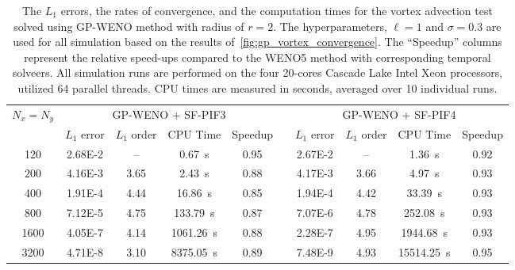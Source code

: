 \begin{table}
    \centering
    \caption{The \( L_{1} \) errors, the rates of convergence,
        and the computation times for the vortex advection test
        solved using GP-WENO method with radius of \( r = 2 \).
        The hyperparameters, \( \ell = 1 \) and \( \sigma = 0.3 \)
        are used for all simulation based on the results of~\cref{fig:gp_vortex_convergence}.
        The ``Speedup'' columns represent the relative speed-ups
        compared to the WENO5 method with corresponding temporal solveers.
        All simulation runs are
        performed on the four 20-cores
        Cascade Lake Intel Xeon processors, utilized 64 parallel threads.
        CPU times are measured in seconds, averaged over 10 individual runs.
    }\label{table:vortex_gp2}
    \begin{adjustbox}{width=\textwidth}
        \begin{tabular}{@{}ccccclcccc@{}}
            \toprule
            \multirow{2}{*}{\( N_{x} = N_{y} \)} & \multicolumn{4}{c}{GP-WENO + SF-PIF3} &  & \multicolumn{4}{c}{GP-WENO + SF-PIF4} \\
            \cmidrule(lr){2-5} \cmidrule(l){7-10}
            & \(L_{1}\) error & \(L_{1}\) order & CPU Time & Speedup &  &
            \(L_{1}\) error & \(L_{1}\) order & CPU Time & Speedup \\ \midrule
            120  & \num{2.68E-2} & \--- & \SI{0.67}{\second}      & 0.95 &  & \num{2.67E-2} & \--- & \SI{1.36}{\second}     & 0.92 \\
            200  & \num{4.16E-3} & 3.65 & \SI{2.43}{\second}      & 0.88 &  & \num{4.17E-3} & 3.66 & \SI{4.97}{\second}     & 0.93 \\
            400  & \num{1.91E-4} & 4.44 & \SI{16.86}{\second}     & 0.85 &  & \num{1.94E-4} & 4.42 & \SI{33.39}{\second}    & 0.93 \\
            800  & \num{7.12E-5} & 4.75 & \SI{133.79}{\second}    & 0.87 &  & \num{7.07E-6} & 4.78 & \SI{252.08}{\second}   & 0.93 \\
            1600 & \num{4.05E-7} & 4.14 & \SI{1061.26}{\second}   & 0.88 &  & \num{2.28E-7} & 4.95 & \SI{1944.68}{\second}  & 0.93 \\
            3200 & \num{4.71E-8} & 3.10 & \SI{8375.05}{\second}   & 0.89 &  & \num{7.48E-9} & 4.93 & \SI{15514.25}{\second} & 0.95 \\
        \end{tabular}
    \end{adjustbox}
\end{table}

